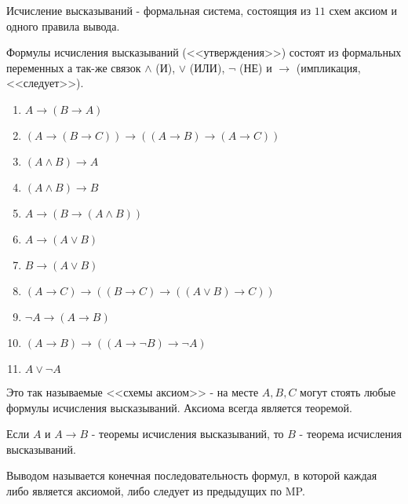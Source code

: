 

Исчисление высказываний - формальная система, состоящия из $11$ схем аксиом и одного правила вывода.

Формулы исчисления высказываний (<<утверждения>>) состоят из формальных переменных а так-же связок $\land$ (И), $\lor$ (ИЛИ), $\neg$ (НЕ) и $\to$ (импликация, <<следует>>).

\begin{definition} \thmslashn 
    \begin{enumerate}
        \item $A \to (B \to A)$
        \item $(A \to (B \to C)) \to ((A \to B) \to (A \to C))$
        \item $(A \land B) \to A$
        \item $(A \land B) \to B$
        \item $A \to (B \to (A \land B))$
        \item $A \to (A \lor B)$
        \item $B \to (A \lor B)$
        \item $(A \to C) \to ((B \to C) \to ((A \lor B) \to C))$
        \item $\neg A \to (A \to B)$
        \item $(A \to B) \to ((A \to \neg B) \to \neg A)$
        \item $A \lor \neg A$
    \end{enumerate}
\end{definition}

Это так называемые <<схемы аксиом>> - на месте $A, B, C$ могут стоять любые формулы исчисления высказываний. Аксиома всегда является теоремой.

\begin{definition} \thmslashn 

    Если $A$ и $A \to B$ - теоремы исчисления высказываний, то $B$ - теорема исчисления высказываний.
\end{definition}


\begin{definition}[Вывод] \thmslashn 

Выводом называется конечная последовательность формул, в которой каждая либо является аксиомой, либо следует из предыдущих по MP.

\end{definition}

